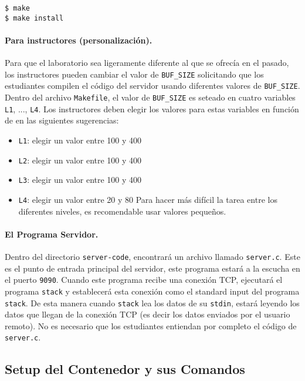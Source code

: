 \begin{lstlisting}
$ make
$ make install
\end{lstlisting}
 

\paragraph{Para instructores (personalización).}
Para que el laboratorio sea ligeramente diferente al que se ofrecía en el pasado,
los instructores pueden cambiar el valor de \texttt{BUF\_SIZE} solicitando
que los estudiantes compilen el código del servidor usando diferentes valores de \texttt {BUF\_SIZE}.
Dentro del archivo \texttt{Makefile}, el valor de \texttt{BUF\_SIZE} es seteado en 
cuatro variables \texttt{L1}, ..., \texttt{L4}.
Los instructores deben elegir los valores para estas variables en función de
en las siguientes sugerencias:

\begin{itemize}[noitemsep]
\item \texttt{L1}: elegir un valor entre 100 y 400
\item \texttt{L2}: elegir un valor entre 100 y 400
\item \texttt{L3}: elegir un valor entre 100 y 400
\item \texttt{L4}: elegir un valor entre 20 y 80
Para hacer más difícil la tarea entre los diferentes niveles, es recomendable usar valores pequeños.
\end{itemize}



\paragraph{El Programa Servidor.} 
Dentro del directorio \texttt{server-code}, encontrará un archivo llamado \texttt{server.c}.
Este es el punto de entrada principal del servidor, este programa estará a la escucha en el puerto \texttt{9090}. 
Cuando este programa recibe una conexión TCP, ejecutará el programa \texttt{stack} y establecerá esta conexión como el standard input del programa \texttt{stack}. De esta manera cuando \texttt{stack} lea los datos de su \texttt{stdin}, estará leyendo los datos que llegan de la conexión TCP (es decir los datos enviados por el usuario remoto). No es necesario que los estudiantes entiendan por completo el código de \texttt{server.c}.


\subsection{Setup del Contenedor y sus Comandos}

